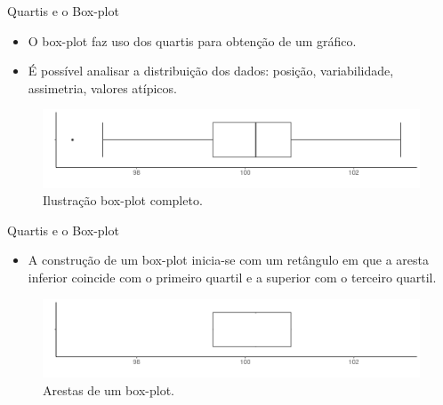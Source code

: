 \documentclass[
  ignorenonframetext,
  serif,
  professionalfont,
  usenames,
  dvipsnames,
  aspectratio = 169]{beamer}
\providecommand{\tightlist}{%
  \setlength{\itemsep}{0pt}\setlength{\parskip}{0pt}}
\renewcommand{\tightlist}{%
  \setlength{\itemsep}{0\baselineskip}
  \setlength{\parskip}{0.25\baselineskip}
}
\begin{document}
\begin{frame}{Quartis e o Box-plot}
\protect\hypertarget{quartis-e-o-box-plot}{}
\begin{itemize}
\tightlist
\item
  O box-plot faz uso dos quartis para obtenção de um gráfico.
\item
  É possível analisar a distribuição dos dados: posição, variabilidade,
  assimetria, valores atípicos.
\end{itemize}

\begin{figure}

{\centering \includegraphics[width=0.9\linewidth]{./img/boxplot0} 

}

\caption{Ilustração box-plot completo.}\label{fig:unnamed-chunk-8}
\end{figure}
\end{frame}

\begin{frame}{Quartis e o Box-plot}
\protect\hypertarget{quartis-e-o-box-plot-1}{}
\begin{itemize}
\tightlist
\item
  A construção de um box-plot inicia-se com um retângulo em que a aresta
  inferior coincide com o primeiro quartil e a superior com o terceiro
  quartil.
\end{itemize}

\begin{figure}

{\centering \includegraphics[width=0.9\linewidth]{./img/boxplot1} 

}

\caption{Arestas de um box-plot.}\label{fig:unnamed-chunk-9}
\end{figure}
\end{frame}
\end{document}
